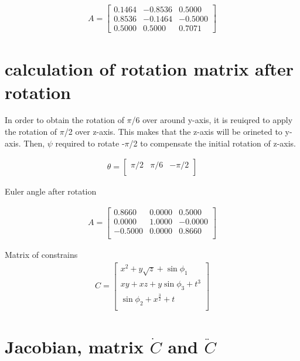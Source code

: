 \documentclass[letterpaper,10pt]{article} %
\begin{document}
\begin{eqnarray*}
	A= \begin{bmatrix}
		0.1464   & -0.8536  &   0.5000\\
		0.8536   & -0.1464   & -0.5000\\
		0.5000   &  0.5000   &  0.7071
	\end{bmatrix}
\end{eqnarray*}


\section{calculation of rotation matrix after rotation} In order to obtain the rotation of $\pi$/6 over around y-axis, it is reuiqred to apply the rotation of $\pi$/2 over z-axis. This makes that the z-axis will be orineted to y-axis. Then, $\psi$ required to rotate -$\pi$/2 to compensate the initial rotation of z-axis.  

\begin{eqnarray*}
	\theta= \begin{bmatrix}
		\pi/2   & \pi/6   &  -\pi/2 \\		
	\end{bmatrix}
\end{eqnarray*}


Euler angle after rotation

\begin{eqnarray*}
	A= \begin{bmatrix}
		0.8660   &  0.0000   &  0.5000\\
		0.0000    & 1.0000   & -0.0000\\
		-0.5000   &  0.0000   &  0.8660\\
	\end{bmatrix}
\end{eqnarray*}


Matrix of constrains
\begin{eqnarray*}
	C = \begin{bmatrix} 
		x^2+y\sqrt{z}+ \sin \phi_1 \\
		xy + xz + y\sin \phi_3+t^3\\
		\sin \phi_2+	x^\frac{3}{2} +t\\
	\end{bmatrix}
\end{eqnarray*}


\section{Jacobian, matrix $\dot C$ and $\ddot C$ }
\end{document}
